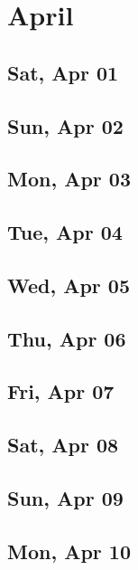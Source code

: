 \chapter{April}
	\section{Sat, Apr 01}
		
	\section{Sun, Apr 02}
		
	\section{Mon, Apr 03}
		
	\section{Tue, Apr 04}
		
	\section{Wed, Apr 05}
		
	\section{Thu, Apr 06}
		
	\section{Fri, Apr 07}
		
	\section{Sat, Apr 08}
		
	\section{Sun, Apr 09}
		
	\section{Mon, Apr 10}
		
